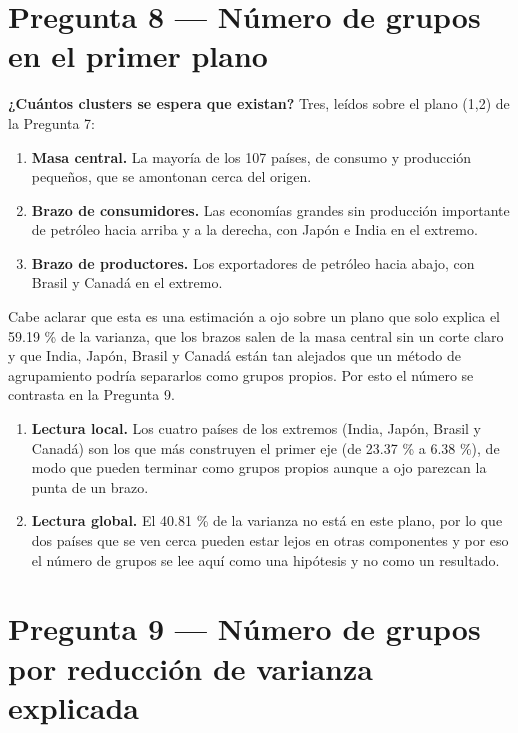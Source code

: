 \documentclass[oneside, openany, fontset=libertinus]{mitthesis}
\providecommand{\tightlist}{\setlength{\itemsep}{0pt}\setlength{\parskip}{0pt}}
\begin{document}
\section{Pregunta 8 --- Número de grupos en el primer plano}\label{p8}

\textbf{¿Cuántos clusters se espera que existan?} Tres, leídos sobre el
plano (1,2) de la Pregunta 7:

\begin{enumerate}
\def\labelenumi{\alph{enumi}.}
\tightlist
\item
  \textbf{Masa central.} La mayoría de los 107 países, de consumo y
  producción pequeños, que se amontonan cerca del origen.
\item
  \textbf{Brazo de consumidores.} Las economías grandes sin producción
  importante de petróleo hacia arriba y a la derecha, con Japón e India
  en el extremo.
\item
  \textbf{Brazo de productores.} Los exportadores de petróleo hacia
  abajo, con Brasil y Canadá en el extremo.
\end{enumerate}

Cabe aclarar que esta es una estimación a ojo sobre un plano que solo
explica el 59.19 \% de la varianza, que los brazos salen de la masa
central sin un corte claro y que India, Japón, Brasil y Canadá están tan
alejados que un método de agrupamiento podría separarlos como grupos
propios. Por esto el número se contrasta en la Pregunta 9.

\begin{enumerate}
\def\labelenumi{\alph{enumi}.}
\tightlist
\item
  \textbf{Lectura local.} Los cuatro países de los extremos (India,
  Japón, Brasil y Canadá) son los que más construyen el primer eje (de
  23.37 \% a 6.38 \%), de modo que pueden terminar como grupos propios
  aunque a ojo parezcan la punta de un brazo.
\item
  \textbf{Lectura global.} El 40.81 \% de la varianza no está en este
  plano, por lo que dos países que se ven cerca pueden estar lejos en
  otras componentes y por eso el número de grupos se lee aquí como una
  hipótesis y no como un resultado.
\end{enumerate}

\section{Pregunta 9 --- Número de grupos por reducción de varianza
explicada}\label{p9}
\end{document}
